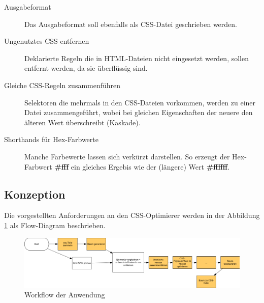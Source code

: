 \begin{description}
    \item[Ausgabeformat] Das Ausgabeformat soll ebenfalls als CSS-Datei geschrieben werden.
    
    \item[Ungenutztes CSS entfernen] Deklarierte Regeln die in HTML-Dateien nicht eingesetzt werden, sollen entfernt werden, da sie überflüssig sind.
    
    \item[Gleiche CSS-Regeln zusammenführen] Selektoren die mehrmals in den CSS-Dateien vorkommen, werden zu einer Datei zusammengeführt, wobei bei gleichen Eigenschaften der neuere den älteren Wert überschreibt (Kaskade).
    
    \item[Shorthands für Hex-Farbwerte] Manche Farbewerte lassen sich verkürzt darstellen. So erzeugt der Hex-Farbwert \textbf{\#fff} ein gleiches Ergebis wie der (längere) Wert \textbf{\#ffffff}. 
    
    \item[]
\end{description}

\subsection{Konzeption}

Die vorgestellten Anforderungen an den CSS-Optimierer werden in der Abbildung \ref{app-workflow} als Flow-Diagram beschrieben. 

\begin{figure}[h!]
	\begin{center}
		\includegraphics[width=1.0\textwidth]{img/app-workflow.png}
		\caption{Workflow der Anwendung}
		\label{app-workflow}	
	\end{center}
\end{figure}